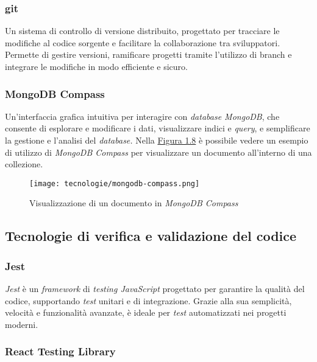 \pagebreak
\subsubsection{git}

Un sistema di controllo di versione distribuito, progettato per tracciare le modifiche al codice sorgente e facilitare la collaborazione tra sviluppatori. \\
Permette di gestire versioni, ramificare progetti tramite l'utilizzo di \gls{branch} e integrare le modifiche in modo efficiente e sicuro. 

\subsubsection{MongoDB Compass}

Un'interfaccia grafica intuitiva per interagire con \textit{database MongoDB}, che consente di esplorare e modificare i dati, visualizzare indici e \textit{query},
e semplificare la gestione e l'analisi del \textit{database.}
Nella {\hyperref[fig:mongodb-compass]{Figura 1.8}} è possibile vedere un esempio di utilizzo di \textit{MongoDB Compass} per visualizzare un documento all'interno di una collezione.

\begin{figure}[H]
    \label{fig:mongodb-compass}
    \centering
    \texttt{[image: tecnologie/mongodb-compass.png]}
    \caption{Visualizzazione di un documento in \textit{MongoDB Compass}}
\end{figure}

\subsection{Tecnologie di verifica e validazione del codice}
\label{sez:tecnologie-validazione-codice}

\subsubsection{Jest}

\textit{Jest} è un \textit{framework} di \textit{testing JavaScript} progettato per garantire la qualità del codice, supportando \textit{test} unitari e di integrazione.
Grazie alla sua semplicità, velocità e funzionalità avanzate, è ideale per \textit{test} automatizzati nei progetti moderni.

\subsubsection{React Testing Library}

